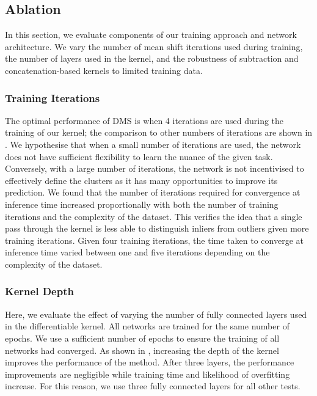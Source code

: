 \documentclass[../thesis.tex]{subfiles}
\begin{document}
    
\subsection{Ablation} 
\label{sec__DMS__ablation} 

In this section, we evaluate components of our training approach and network architecture. We vary the number of mean shift iterations used during training, the number of layers used in the kernel, and the robustness of subtraction and concatenation-based kernels to limited training data.

\subsubsection{Training Iterations}

The optimal performance of DMS is when 4 iterations are used during the training of our kernel; the comparison to other numbers of iterations are shown in .
We hypothesise that when a small number of iterations are used, the network does not have sufficient flexibility to learn the nuance of the given task. 
Conversely, with a large number of iterations, the network is not incentivised to effectively define the clusters as it has many opportunities to improve its prediction. 
We found that the number of iterations required for convergence at inference time increased proportionally with both the number of training iterations and the complexity of the dataset. 
This verifies the idea that a single pass through the kernel is less able to distinguish inliers from outliers given more training iterations.
Given four training iterations, the time taken to converge at inference time varied between one and five iterations depending on the complexity of the dataset.


\subsubsection{Kernel Depth} 

Here, we evaluate the effect of varying the number of fully connected layers used in the differentiable kernel.
All networks are trained for the same number of epochs.
We use a sufficient number of epochs to ensure the training of all networks had converged. 
As shown in , increasing the depth of the kernel improves the performance of the method.
After three layers, the performance improvements are negligible while training time and likelihood of overfitting increase. For this reason, we use three fully connected layers for all other tests.
\end{document}
